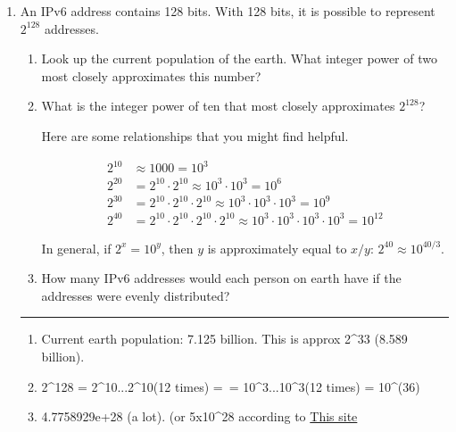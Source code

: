 \documentclass[twoside]{article}
\newenvironment{answer}
  {\vspace*{0.2cm} \rule{12cm}{0.04cm} \vspace*{0.2cm}}
  {\vspace*{0.2cm}}
\begin{document}
\begin{enumerate}
\begin{answer}
    \end{answer}

  \item An IPv6 address contains 128 bits. With 128 bits, it
    is possible to represent $2^{128}$ addresses.
  \begin{enumerate}
    \item Look up the current population of the earth. What integer
      power of two most closely approximates this number?
    \item What is the integer power of ten that most closely
      approximates $2^{128}$?

      Here are some relationships that you might find helpful.

      \begin{align*}
        2^{10} & \approx 1000 = 10^3 \\
        2^{20} & = 2^{10} \cdot 2^{10} \approx 10^3 \cdot 10^3 = 10^6 \\
        2^{30} & = 2^{10} \cdot 2^{10} \cdot 2^{10} \approx 10^3 \cdot 10^3 \cdot 10^3 = 10^9 \\
        2^{40} & = 2^{10} \cdot 2^{10} \cdot 2^{10} \cdot 2^{10} \approx
            10^3 \cdot 10^3 \cdot 10^3 \cdot 10^3 = 10^{12}
        \end{align*}

      In general, if $2^x = 10^y$, then $y$ is approximately equal to $x/y$: $2^{40} \approx 10^{40/3}$.
      
    \item How many IPv6 addresses would each person on earth have if the addresses
      were evenly distributed?
    \end{enumerate}

  \begin{answer}

  \begin{enumerate}
    \item Current earth population: 7.125 billion.  This is approx 2^33 (8.589 billion).
    \item 2^128 = 2^10...2^10(12 times) =~= 10^3...10^3(12 times) = 10^(36)
    \item 4.7758929e+28 (a lot). (or 5x10^28 according to \href{http://itknowledgeexchange.techtarget.com/whatis/ipv6-addresses-how-many-is-that-in-numbers/}{This site}
    \end{enumerate}

    \end{answer}


\end{enumerate}
\end{document}
